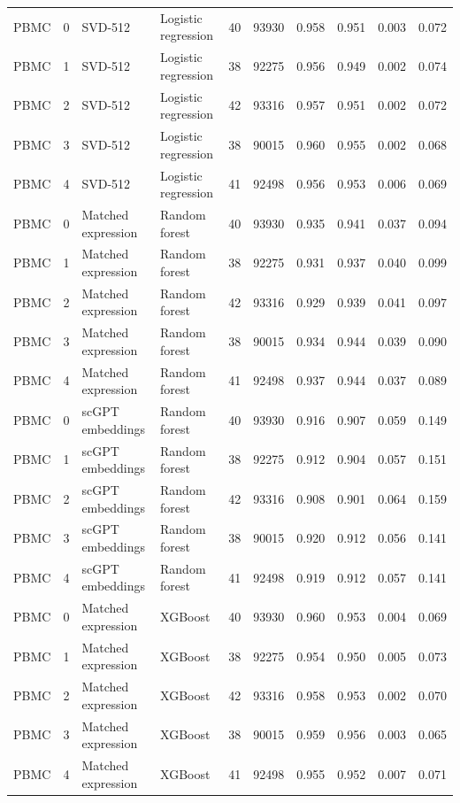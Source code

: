 {\begin{longtable}{lrllrrrrrr}
PBMC & 0 & SVD-512 & Logistic regression & 40 & 93930 & 0.958 & 0.951 & 0.003 & 0.072 \\
PBMC & 1 & SVD-512 & Logistic regression & 38 & 92275 & 0.956 & 0.949 & 0.002 & 0.074 \\
PBMC & 2 & SVD-512 & Logistic regression & 42 & 93316 & 0.957 & 0.951 & 0.002 & 0.072 \\
PBMC & 3 & SVD-512 & Logistic regression & 38 & 90015 & 0.960 & 0.955 & 0.002 & 0.068 \\
PBMC & 4 & SVD-512 & Logistic regression & 41 & 92498 & 0.956 & 0.953 & 0.006 & 0.069 \\
PBMC & 0 & Matched expression & Random forest & 40 & 93930 & 0.935 & 0.941 & 0.037 & 0.094 \\
PBMC & 1 & Matched expression & Random forest & 38 & 92275 & 0.931 & 0.937 & 0.040 & 0.099 \\
PBMC & 2 & Matched expression & Random forest & 42 & 93316 & 0.929 & 0.939 & 0.041 & 0.097 \\
PBMC & 3 & Matched expression & Random forest & 38 & 90015 & 0.934 & 0.944 & 0.039 & 0.090 \\
PBMC & 4 & Matched expression & Random forest & 41 & 92498 & 0.937 & 0.944 & 0.037 & 0.089 \\
PBMC & 0 & scGPT embeddings & Random forest & 40 & 93930 & 0.916 & 0.907 & 0.059 & 0.149 \\
PBMC & 1 & scGPT embeddings & Random forest & 38 & 92275 & 0.912 & 0.904 & 0.057 & 0.151 \\
PBMC & 2 & scGPT embeddings & Random forest & 42 & 93316 & 0.908 & 0.901 & 0.064 & 0.159 \\
PBMC & 3 & scGPT embeddings & Random forest & 38 & 90015 & 0.920 & 0.912 & 0.056 & 0.141 \\
PBMC & 4 & scGPT embeddings & Random forest & 41 & 92498 & 0.919 & 0.912 & 0.057 & 0.141 \\
PBMC & 0 & Matched expression & XGBoost & 40 & 93930 & 0.960 & 0.953 & 0.004 & 0.069 \\
PBMC & 1 & Matched expression & XGBoost & 38 & 92275 & 0.954 & 0.950 & 0.005 & 0.073 \\
PBMC & 2 & Matched expression & XGBoost & 42 & 93316 & 0.958 & 0.953 & 0.002 & 0.070 \\
PBMC & 3 & Matched expression & XGBoost & 38 & 90015 & 0.959 & 0.956 & 0.003 & 0.065 \\
PBMC & 4 & Matched expression & XGBoost & 41 & 92498 & 0.955 & 0.952 & 0.007 & 0.071 \\

\end{longtable}}
